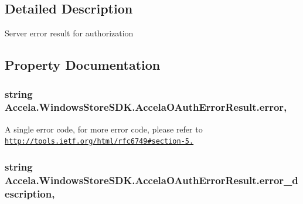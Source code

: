 \subsection{Detailed Description}
Server error result for authorization 



\subsection{Property Documentation}
\hypertarget{class_accela_1_1_windows_store_s_d_k_1_1_accela_o_auth_error_result_a82fb3e58c6e93a8a68acf5e71817a857}{
\subsubsection[{error}]{\setlength{\rightskip}{0pt plus 5cm}string Accela.\+Windows\+Store\+S\+D\+K.\+Accela\+O\+Auth\+Error\+Result.\+error\hspace{0.3cm}{\ttfamily [get]}, {\ttfamily [set]}}}\label{class_accela_1_1_windows_store_s_d_k_1_1_accela_o_auth_error_result_a82fb3e58c6e93a8a68acf5e71817a857}


A single error code, for more error code, please refer to \href{http://tools.ietf.org/html/rfc6749#section-5.2}{\tt http\+://tools.\+ietf.\+org/html/rfc6749\#section-\/5.} 

\hypertarget{class_accela_1_1_windows_store_s_d_k_1_1_accela_o_auth_error_result_a2e67c37c028389e1bb95c1ad550e544f}{
\subsubsection[{error\+\_\+description}]{\setlength{\rightskip}{0pt plus 5cm}string Accela.\+Windows\+Store\+S\+D\+K.\+Accela\+O\+Auth\+Error\+Result.\+error\+\_\+description\hspace{0.3cm}{\ttfamily [get]}, {\ttfamily [set]}}}\label{class_accela_1_1_windows_store_s_d_k_1_1_accela_o_auth_error_result_a2e67c37c028389e1bb95c1ad550e544f}


